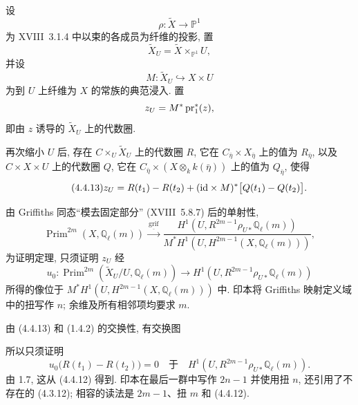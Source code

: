 设
\begin{equation*}
\rho:\widetilde X\longrightarrow\mathbb P^1
\end{equation*}
为 XVIII~3.1.4 中以束的各成员为纤维的投影, 置
\begin{equation*}
\widetilde X_U=\widetilde X\times_{\mathbb P^1}U,
\end{equation*}
并设
\begin{equation*}
M:\widetilde X_U\hookrightarrow X\times U
\end{equation*}
为到 $U$ 上纤维为 $X$ 的常族的典范浸入. 置
\begin{equation*}
z_U=M^*\operatorname{pr}_1^*(z),
\end{equation*}
即由 $z$ 诱导的 $\widetilde X_U$ 上的代数圈.

再次缩小 $U$ 后, 存在 $C\times_U\widetilde X_U$ 上的代数圈 $R$, 它在 $C_{\bar\eta}\times X_{\bar\eta}$ 上的值为 $R_{\bar\eta}$, 以及 $C\times X\times U$ 上的代数圈 $Q$, 它在 $C_{\bar\eta}\times(X\otimes_k k(\bar\eta))$ 上的值为 $Q_{\bar\eta}$, 使得
\begin{equation}\tag{4.4.13}
z_U=R(t_1)-R(t_2)
+(\mathrm{id}\times M)^*\bigl[Q(t_1)-Q(t_2)\bigr].
\end{equation}

由 Griffiths 同态``模去固定部分'' (XVIII~5.8.7) 后的单射性,
\begin{equation*}
\operatorname{Prim}^{2m}(X,\mathbb Q_\ell(m))
\xrightarrow{\ \underline{\operatorname{grif}}\ }
\frac{H^1(U,R^{2m-1}\rho_{U*}\mathbb Q_\ell(m))}
{M^*H^1(U,H^{2m-1}(X,\mathbb Q_\ell(m)))},
\end{equation*}
为证明定理, 只须证明 $z_U$ 经
\begin{equation*}
u_0:\operatorname{Prim}^{2m}(\widetilde X_U/U,\mathbb Q_\ell(m))
\longrightarrow H^1(U,R^{2m-1}\rho_{U*}\mathbb Q_\ell(m))
\end{equation*}
所得的像位于 $M^*H^1(U,H^{2m-1}(X,\mathbb Q_\ell(m)))$ 中.
印本将 Griffiths 映射定义域中的扭写作 $n$; 余维及所有相邻项均要求 $m$.

由 (4.4.13) 和 (1.4.2) 的交换性, 有交换图
\begin{center}
\end{center}
所以只须证明
\begin{equation*}
u_0\bigl(R(t_1)-R(t_2)\bigr)=0
\quad\text{于}\quad
H^1(U,R^{2m-1}\rho_{U*}\mathbb Q_\ell(m)).
\end{equation*}
由 1.7, 这从 (4.4.12) 得到. 印本在最后一群中写作 $2n-1$ 并使用扭 $n$, 还引用了不存在的 (4.3.12); 相容的读法是 $2m-1$、扭 $m$ 和 (4.4.12).
